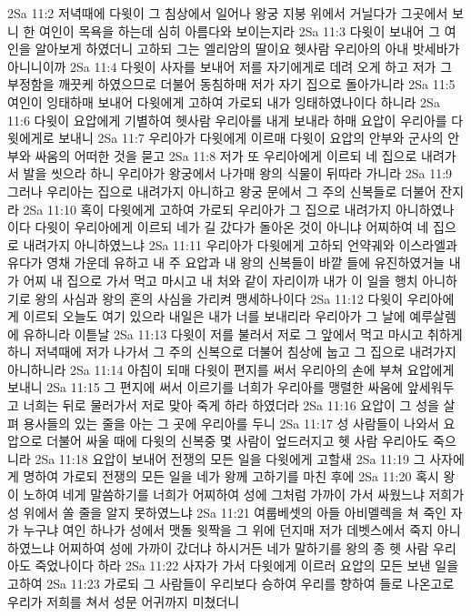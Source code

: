 2Sa 11:2  저녁때에 다윗이 그 침상에서 일어나 왕궁 지붕 위에서 거닐다가 그곳에서 보니 한 여인이 목욕을 하는데 심히 아름다와 보이는지라
2Sa 11:3  다윗이 보내어 그 여인을 알아보게 하였더니 고하되 그는 엘리암의 딸이요 헷사람 우리아의 아내 밧세바가 아니니이까
2Sa 11:4  다윗이 사자를 보내어 저를 자기에게로 데려 오게 하고 저가 그 부정함을 깨끗케 하였으므로 더불어 동침하매 저가 자기 집으로 돌아가니라
2Sa 11:5  여인이 잉태하매 보내어 다윗에게 고하여 가로되 내가 잉태하였나이다 하니라
2Sa 11:6  다윗이 요압에게 기별하여 헷사람 우리아를 내게 보내라 하매 요압이 우리아를 다윗에게로 보내니
2Sa 11:7  우리아가 다윗에게 이르매 다윗이 요압의 안부와 군사의 안부와 싸움의 어떠한 것을 묻고
2Sa 11:8  저가 또 우리아에게 이르되 네 집으로 내려가서 발을 씻으라 하니 우리아가 왕궁에서 나가매 왕의 식물이 뒤따라 가니라
2Sa 11:9  그러나 우리아는 집으로 내려가지 아니하고 왕궁 문에서 그 주의 신복들로 더불어 잔지라
2Sa 11:10  혹이 다윗에게 고하여 가로되 우리아가 그 집으로 내려가지 아니하였나이다 다윗이 우리아에게 이르되 네가 길 갔다가 돌아온 것이 아니냐 어찌하여 네 집으로 내려가지 아니하였느냐
2Sa 11:11  우리아가 다윗에게 고하되 언약궤와 이스라엘과 유다가 영채 가운데 유하고 내 주 요압과 내 왕의 신복들이 바깥 들에 유진하였거늘 내가 어찌 내 집으로 가서 먹고 마시고 내 처와 같이 자리이까 내가 이 일을 행치 아니하기로 왕의 사심과 왕의 혼의 사심을 가리켜 맹세하나이다
2Sa 11:12  다윗이 우리아에게 이르되 오늘도 여기 있으라 내일은 내가 너를 보내리라 우리아가 그 날에 예루살렘에 유하니라 이튿날
2Sa 11:13  다윗이 저를 불러서 저로 그 앞에서 먹고 마시고 취하게 하니 저녁때에 저가 나가서 그 주의 신복으로 더불어 침상에 눕고 그 집으로 내려가지 아니하니라
2Sa 11:14  아침이 되매 다윗이 편지를 써서 우리아의 손에 부쳐 요압에게 보내니
2Sa 11:15  그 편지에 써서 이르기를 너희가 우리아를 맹렬한 싸움에 앞세워두고 너희는 뒤로 물러가서 저로 맞아 죽게 하라 하였더라
2Sa 11:16  요압이 그 성을 살펴 용사들의 있는 줄을 아는 그 곳에 우리아를 두니
2Sa 11:17  성 사람들이 나와서 요압으로 더불어 싸울 때에 다윗의 신복중 몇 사람이 엎드러지고 헷 사람 우리아도 죽으니라
2Sa 11:18  요압이 보내어 전쟁의 모든 일을 다윗에게 고할새
2Sa 11:19  그 사자에게 명하여 가로되 전쟁의 모든 일을 네가 왕께 고하기를 마친 후에
2Sa 11:20  혹시 왕이 노하여 네게 말씀하기를 너희가 어찌하여 성에 그처럼 가까이 가서 싸웠느냐 저희가 성 위에서 쏠 줄을 알지 못하였느냐
2Sa 11:21  여룹베셋의 아들 아비멜렉을 쳐 죽인 자가 누구냐 여인 하나가 성에서 맷돌 윗짝을 그 위에 던지매 저가 데벳스에서 죽지 아니 하였느냐 어찌하여 성에 가까이 갔더냐 하시거든 네가 말하기를 왕의 종 헷 사람 우리아도 죽었나이다 하라
2Sa 11:22  사자가 가서 다윗에게 이르러 요압의 모든 보낸 일을 고하여
2Sa 11:23  가로되 그 사람들이 우리보다 승하여 우리를 향하여 들로 나온고로 우리가 저희를 쳐서 성문 어귀까지 미쳤더니
